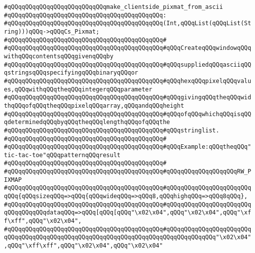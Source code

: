 \newline
\newline
\newline
\verb|#qQQqqQQqqQQqqQQqqQQqqQQqqQQqmake_clientside_pixmat_from_ascii|\newline
\verb|#qQQqqQQqqQQqqQQqqQQqqQQqqQQqqQQqqQQqqQQqqQQq:|\newline
\verb|#qQQqqQQqqQQqqQQqqQQqqQQqqQQqqQQqqQQqqQQqqQQq(Int,qQQqList(qQQqList(String)))qQQq->qQQqCs_Pixmat;|\newline
\verb|#qQQqqQQqqQQqqQQqqQQqqQQqqQQqqQQqqQQqqQQqqQQq#|\newline
\verb|#qQQqqQQqqQQqqQQqqQQqqQQqqQQqqQQqqQQqqQQqqQQq#qQQqCreateqQQqwindowqQQqwithqQQqcontentsqQQqgivenqQQqby|\newline
\verb|#qQQqqQQqqQQqqQQqqQQqqQQqqQQqqQQqqQQqqQQqqQQq#qQQqsuppliedqQQqasciiqQQqstringsqQQqspecifyingqQQqbinaryqQQqor|\newline
\verb|#qQQqqQQqqQQqqQQqqQQqqQQqqQQqqQQqqQQqqQQqqQQq#qQQqhexqQQqpixelqQQqvalues,qQQqwithqQQqtheqQQqintegerqQQqparameter|\newline
\verb|#qQQqqQQqqQQqqQQqqQQqqQQqqQQqqQQqqQQqqQQqqQQq#qQQqgivingqQQqtheqQQqwidthqQQqofqQQqtheqQQqpixelqQQqarray,qQQqandqQQqheight|\newline
\verb|#qQQqqQQqqQQqqQQqqQQqqQQqqQQqqQQqqQQqqQQqqQQq#qQQqofqQQqwhichqQQqisqQQqdeterminedqQQqbyqQQqtheqQQqlengthqQQqofqQQqthe|\newline
\verb|#qQQqqQQqqQQqqQQqqQQqqQQqqQQqqQQqqQQqqQQqqQQq#qQQqstringlist.|\newline
\verb|#qQQqqQQqqQQqqQQqqQQqqQQqqQQqqQQqqQQqqQQqqQQq#|\newline
\verb|#qQQqqQQqqQQqqQQqqQQqqQQqqQQqqQQqqQQqqQQqqQQq#qQQqExample:qQQqtheqQQq"tic-tac-toe"qQQqpatternqQQqresult|\newline
\verb|#qQQqqQQqqQQqqQQqqQQqqQQqqQQqqQQqqQQqqQQqqQQq#|\newline
\verb|#qQQqqQQqqQQqqQQqqQQqqQQqqQQqqQQqqQQqqQQqqQQq#qQQqqQQqqQQqqQQqqQQqRW_PIXMAP|\newline
\verb|#qQQqqQQqqQQqqQQqqQQqqQQqqQQqqQQqqQQqqQQqqQQq#qQQqqQQqqQQqqQQqqQQqqQQqqQQq{qQQqsizeqQQq=>qQQq{qQQqwideqQQq=>qQQq8,qQQqhighqQQq=>qQQq8qQQq},|\newline
\verb|#qQQqqQQqqQQqqQQqqQQqqQQqqQQqqQQqqQQqqQQqqQQq#qQQqqQQqqQQqqQQqqQQqqQQqqQQqqQQqqQQqdataqQQq=>qQQq[qQQq[qQQq"\x02\x04",qQQq"\x02\x04",qQQq"\xff\xff",qQQq"\x02\x04",|\newline
\verb|#qQQqqQQqqQQqqQQqqQQqqQQqqQQqqQQqqQQqqQQqqQQq#qQQqqQQqqQQqqQQqqQQqqQQqqQQqqQQqqQQqqQQqqQQqqQQqqQQqqQQqqQQqqQQqqQQqqQQqqQQqqQQqqQQq"\x02\x04",qQQq"\xff\xff",qQQq"\x02\x04",qQQq"\x02\x04"|\newline
